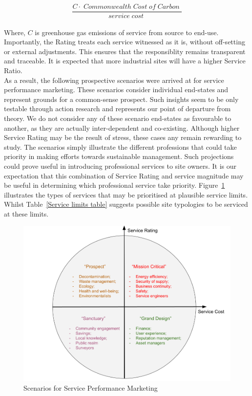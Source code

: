 \documentclass[12pt, oneside]{article}   	%
\begin{document}
\begin{equation}
	\frac{C  \cdot \;Commonwealth\; Cost\; of\; Carbon\;}{service\; cost\;}
\end{equation}\\

Where, $C$ is greenhouse gas emissions of service from source to end-use.
Importantly, the Rating treats each service witnessed as it is, without off-setting or external adjustments.
This ensures that the responsiblity remains transparent and traceable.
It is expected that more industrial sites will have a higher Service Ratio.\\

As a result, the following prospective scenarios were arrived at for service performance marketing.
These scenarios consider individual end-states and represent grounds for a common-sense prospect.
Such insights seem to be only testable through action research and represents our point of departure from theory.
We do not consider any of these scenario end-states as favourable to another, as they are actually inter-dependent and co-existing.
Although higher Service Rating may be the result of stress, these cases any remain rewarding to study.
The scenarios simply illustrate the different professions that could take priority in making efforts towards sustainable management.
Such projections could prove useful in introducing professional services to site owners.
It is our expectation that this combination of Service Rating and service magnitude may be useful in determining which professional service take priority.
Figure~\ref{Scenarios} illustrates the types of services that may be prioritised at plausible service limits.
Whilst Table~\ref{Service limits table} suggests possible site typologies to be serviced at these limits.\\

\begin{figure}[H]
\centering
\includegraphics[width=1\textwidth]{scenarios}
\caption{Scenarios for Service Performance Marketing}
\label{Scenarios}
\end{figure}
\end{document}
